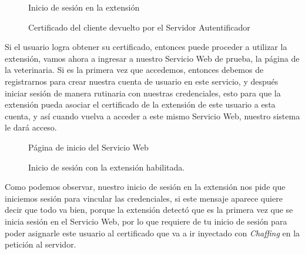 \documentclass[12pt, a4paper, titlepage]{report}
\begin{document}
    	    \begin{figure}[H]
    	        \centering
    	        
    	        \caption{Inicio de sesión en la extensión}
    	        \label{fig:pruebaInicioSesionUI}
    	    \end{figure}
	    
    	    \begin{figure}[H]
    	        \centering
    	        
    	        \caption{Certificado del cliente devuelto por el Servidor Autentificador}
    	        \label{fig:certClienteRed}
    	    \end{figure}
	    
	        Si el usuario logra obtener su certificado, entonces puede proceder a utilizar la extensión, vamos ahora a ingresar a nuestro Servicio Web de prueba, la página de la veterinaria. Si es la primera vez que accedemos, entonces debemos de registrarnos para crear nuestra cuenta de usuario en este servicio, y después iniciar sesión de manera rutinaria con nuestras credenciales, esto para que la extensión pueda asociar el certificado de la extensión de este usuario a esta cuenta, y así cuando vuelva a acceder a este mismo Servicio Web, nuestro sistema le dará acceso. 
	    
    	    \begin{figure}[H]
    	        \centering
    	        
    	        \caption{Página de inicio del Servicio Web}
    	        \label{fig:pruebaHomeUser}
    	    \end{figure}
	    
    	    \begin{figure}[H]
    	        \centering
    	        
    	        \caption{Inicio de sesión con la extensión habilitada.}
    	        \label{fig:pruebasLoginChaffing}
    	    \end{figure}
	    
	        Como podemos observar, nuestro inicio de sesión en la extensión nos pide que iniciemos sesión para vincular las credenciales, si este mensaje aparece quiere decir que todo va bien, porque la extensión detectó que es la primera vez que se inicia sesión en el Servicio Web, por lo que requiere de tu inicio de sesión para poder asignarle este usuario al certificado que va a ir inyectado con \textit{Chaffing} en la petición al servidor.\\
	    
\end{document}
